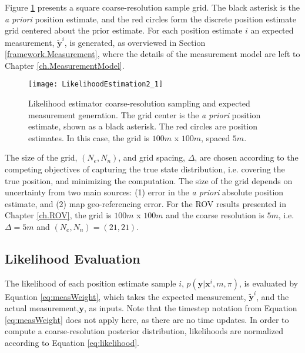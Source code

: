 Figure \ref{fig:coarseInit} presents a square coarse-resolution sample grid.  The black asterisk is the \emph{a priori} position estimate, and the red circles form the discrete position estimate grid centered about the prior estimate.
For each position estimate $i$ an expected measurement, $\tilde{\mathbf{y}}^{i}$, is generated, as overviewed in Section \ref{framework.Measurement}, where the details of the measurement model are left to Chapter \ref{ch.MeasurementModel}.
\\
\begin{figure}[!h]
	\centering
         \texttt{[image: LikelihoodEstimation2\_1]}
         \caption{Likelihood estimator coarse-resolution sampling and expected measurement generation. The grid center is the \emph{a priori} position estimate, shown as a black asterisk. The red circles are position estimates.  In this case, the grid is $100m$ x $100m$, spaced $5m$.}
	\label{fig:coarseInit}
\end{figure}

The size of the grid, $(N_e, N_n)$, and grid spacing, $\Delta$, are chosen according to the competing objectives of capturing the true state distribution, i.e. covering the true position, and minimizing the computation.
The size of the grid depends on uncertainty from two main sources: (1) error in the \emph{a priori} absolute position estimate, and (2) map geo-referencing error. 
For the ROV results presented in Chapter \ref{ch.ROV}, the grid is $100m$ x $100m$ and the coarse resolution is $5m$, i.e. $\Delta = 5m$ and $(N_e, N_n) = (21, 21)$.

\subsection{Likelihood Evaluation}
\label{framework.Motionless.Likelihood}

The likelihood of each position estimate sample $i$, $p(\mathbf{y} | \mathbf{x}^{i}, m, \pi)$, is evaluated by Equation \ref{eq:measWeight}, which takes the expected measurement, $\tilde{\mathbf{y}}^{i}$, and the actual measurement,$\mathbf{y}$, as inputs.
Note that the timestep notation from Equation \ref{eq:measWeight} does not apply here, as there are no time updates.
In order to compute a coarse-resolution posterior distribution, likelihoods are normalized according to Equation \ref{eq:likelihood}.

